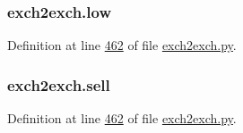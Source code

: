 \subsubsection[{\texorpdfstring{low}{low}}]{\setlength{\rightskip}{0pt plus 5cm}exch2exch.\+low}\hypertarget{namespaceexch2exch_a4ac63aa243bfdafff14b150c675ad9bc}{}\label{namespaceexch2exch_a4ac63aa243bfdafff14b150c675ad9bc}


Definition at line \hyperlink{exch2exch_8py_source_l00462}{462} of file \hyperlink{exch2exch_8py_source}{exch2exch.\+py}.

\subsubsection[{\texorpdfstring{sell}{sell}}]{\setlength{\rightskip}{0pt plus 5cm}exch2exch.\+sell}\hypertarget{namespaceexch2exch_a66d338f409060f7cbcb49da894f5c3e4}{}\label{namespaceexch2exch_a66d338f409060f7cbcb49da894f5c3e4}


Definition at line \hyperlink{exch2exch_8py_source_l00462}{462} of file \hyperlink{exch2exch_8py_source}{exch2exch.\+py}.


